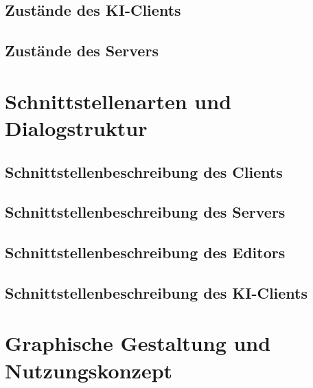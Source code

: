 \documentclass{uulm-assignment}
\begin{document}
\subsection{Zustände des KI-Clients}


\subsection{Zustände des Servers}

\clearpage

\section{Schnittstellenarten und Dialogstruktur}
\subsection{Schnittstellenbeschreibung des Clients}

\clearpage

\subsection{Schnittstellenbeschreibung des Servers}

\clearpage

\subsection{Schnittstellenbeschreibung des Editors}

\clearpage

\subsection{Schnittstellenbeschreibung des KI-Clients}

\clearpage

\section{Graphische Gestaltung und Nutzungskonzept}

\clearpage
\end{document}
